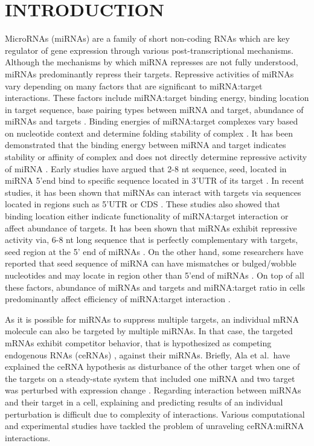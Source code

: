 \documentclass[a4,center,fleqn]{NAR}
\begin{document}
\section{INTRODUCTION}

MicroRNAs (miRNAs) are a family of short non-coding RNAs which are key
regulator of gene expression through various post-transcriptional
mechanisms. Although the mechanisms by which miRNA represses are not
fully understood, miRNAs predominantly repress their targets. Repressive
activities of miRNAs vary depending on many factors that are significant
to miRNA:target interactions. These factors include miRNA:target binding
energy, binding location in target sequence, base pairing types between
miRNA and target, abundance of miRNAs and targets
\citep{grimson_microrna_2007}. Binding energies of miRNA:target
complexes vary based on nucleotide context and determine folding
stability of complex \citep{cao_predicting_2012}. It has been
demonstrated that the binding energy between miRNA and target indicates
stability or affinity of complex \citep{helwak_mapping_2013} and does
not directly determine repressive activity of miRNA
\citep{cao_predicting_2012}. Early studies have argued that 2-8 nt
sequence, seed, located in miRNA 5'end bind to specific sequence located
in 3'UTR of its target
\citep{bartel_micrornas_2004, lewis_conserved_2005}. In recent studies,
it has been shown that miRNAs can interact with targets via sequences
located in regions such as 5'UTR or CDS
\citep{hausser_analysis_2013, helwak_mapping_2013, moore_mirnatarget_2015}.
These studies also showed that binding location either indicate
functionality of miRNA:target interaction or affect abundance of
targets. It has been shown that miRNAs exhibit repressive activity via,
6-8 nt long sequence that is perfectly complementary with targets, seed
region at the 5' end of miRNAs
\citep{bartel_micrornas:_2009, grimson_microrna_2007}. On the other
hand, some researchers have reported that seed sequence of miRNA can
have mismatches or bulged/wobble nucleotides \citep{chi2012alternative}
and may locate in region other than 5'end of miRNAs
\citep{hafner_transcriptome-wide_2010, helwak_mapping_2013}. On top of
all these factors, abundance of miRNAs and targets and miRNA:target
ratio in cells predominantly affect efficiency of miRNA:target
interaction
\citep{arvey_target_2010, bosson_endogenous_2014, denzler_assessing_2014}.

As it is possible for miRNAs to suppress multiple targets, an individual
mRNA molecule can also be targeted by multiple miRNAs. In that case, the
targeted mRNAs exhibit competitor behavior, that is hypothesized as
competing endogenous RNAs (ceRNAs)
\citep{ala_integrated_2013, cesana_deciphering_2013}, against their
miRNAs. Briefly, Ala et al.~have explained the ceRNA hypothesis as
disturbance of the other target when one of the targets on a
steady-state system that included one miRNA and two target was perturbed
with expression change \citep{ala_integrated_2013}. Regarding
interaction between miRNAs and their target in a cell, explaining and
predicting results of an individual perturbation is difficult due to
complexity of interactions. Various computational and experimental
studies have tackled the problem of unraveling ceRNA:miRNA interactions.
\end{document}
